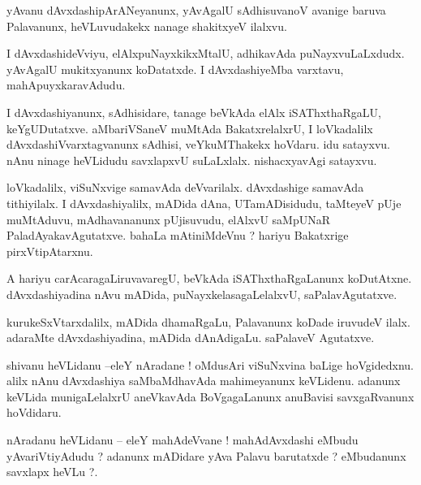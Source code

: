 \documentclass{article}
\begin{document}
\begin{mn}%
yAvanu dAvxdashipArANeyanunx, yAvAgalU sAdhisuvanoV avanige baruva Palavanunx, heVLuvudakekx nanage 
shakitxyeV ilalxvu. 
\end{mn}

\begin{mn}%
I dAvxdashideVviyu, elAlxpuNayxkikxMtalU, adhikavAda puNayxvuLaLxdudx. yAvAgalU mukitxyanunx 
koDatatxde. I dAvxdashiyeMba varxtavu, mahApuyxkaravAdudu.
\end{mn}

\begin{mn}%
I dAvxdashiyanunx, sAdhisidare, tanage beVkAda elAlx iSAThxthaRgaLU, keYgUDutatxve. aMbariVSaneV 
muMtAda BakatxrelalxrU, I loVkadalilx dAvxdashiVvarxtagvanunx sAdhisi, veYkuMThakekx hoVdaru. idu 
satayxvu. nAnu ninage heVLidudu savxlapxvU suLaLxlalx. nishacxyavAgi satayxvu.
\end{mn}

\begin{mn}%
loVkadalilx, viSuNxvige samavAda deVvarilalx. dAvxdashige samavAda tithiyilalx. I dAvxdashiyalilx, 
mADida dAna, UTamADisidudu, taMteyeV pUje muMtAduvu, mAdhavananunx pUjisuvudu, elAlxvU saMpUNaR 
PaladAyakavAgutatxve. bahaLa mAtiniMdeVnu ? hariyu Bakatxrige pirxVtipAtarxnu.
\end{mn}

\begin{mn}%
A hariyu carAcaragaLiruvavaregU, beVkAda iSAThxthaRgaLanunx koDutAtxne. dAvxdashiyadina nAvu 
mADida, puNayxkelasagaLelalxvU, saPalavAgutatxve.
\end{mn}

\begin{mn}%
kurukeSxVtarxdalilx, mADida dhamaRgaLu, Palavanunx koDade iruvudeV ilalx. adaraMte dAvxdashiyadina, 
mADida dAnAdigaLu. saPalaveV Agutatxve.
\end{mn}


\begin{mn}%
shivanu heVLidanu --eleY nAradane ! oMdusAri viSuNxvina baLige hoVgidedxnu. alilx nAnu dAvxdashiya 
saMbaMdhavAda mahimeyanunx keVLidenu. adanunx keVLida munigaLelalxrU aneVkavAda BoVgagaLanunx 
anuBavisi savxgaRvanunx hoVdidaru.
\end{mn}

\begin{mn}%
nAradanu heVLidanu -- eleY mahAdeVvane ! mahAdAvxdashi eMbudu yAvariVtiyAdudu ? adanunx mADidare 
yAva Palavu barutatxde ? eMbudanunx savxlapx heVLu ?.
\end{mn}
\end{document}
